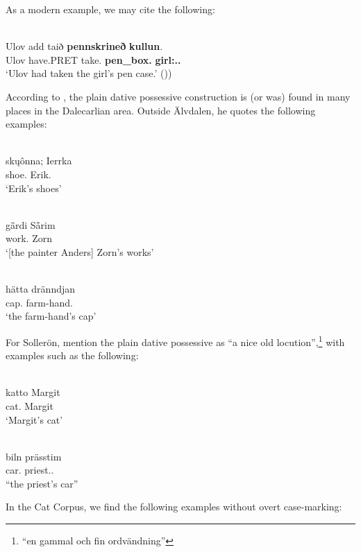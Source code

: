 As a modern example, we may cite the following:

\ea%
\\
\gll Ulov  add  taið  \textbf{pennskrineð} \textbf{kullun}.\\
Ulov  have.PRET  take.{\supp}  \textbf{pen\_box.{}} \textbf{girl:{\dat}.{\sg}.{}}\\
\glt ‘Ulov had taken the girl’s pen case.’ (\citealt[120]{Åkerberg2012}))
\z

According to \citet[112]{Levander1928}, the plain dative possessive construction is (or was) found in many places in the Dalecarlian area. Outside Älvdalen, he quotes the following examples:

\ea%
\\
\gll sk\k{u}ônna;  Ierrka\\
shoe.{\pl}  Erik.{\dat}\\
\glt ‘Erik’s shoes’
\z

\ea%
\\
\gll g\={ä}rdi  S\={å}rim\\
work.{\pl}  Zorn\\
\glt ‘[the painter Anders] Zorn’s works’ 
\z

\ea%
\\
\gll hätta  dränndjan\\
cap.{}  farm-hand.{\dat}\\
\glt ‘the farm-hand’s cap’
\z

For Sollerön, \citet[357]{AnderssonEtAl1999} mention the plain dative possessive as “a nice old locution”,\footnote{ “en gammal och fin ordvändning”} with examples such as the following:

\ea%
\\
\gll katto  Margit\\
cat.{}  Margit\\
\glt ‘Margit’s cat’
\z

\ea%
\\
\gll biln  prässtim\\
car.{}  priest.{}.{\dat}\\
\glt “the priest’s car”
\z

In the Cat Corpus, we find the following examples without overt case-marking:


